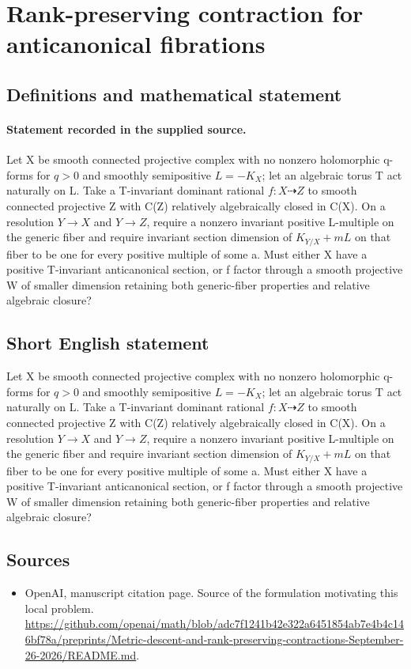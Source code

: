 \documentclass[11pt]{article}
\begin{document}
\section*{Rank-preserving contraction for anticanonical fibrations}\label{statement}
\subsection{Definitions and mathematical statement}
\paragraph{Statement recorded in the supplied source.}
Let X be smooth connected projective complex with no nonzero holomorphic q-forms for $q>0$ and smoothly semipositive $L=-K_X$; let an algebraic torus T act naturally on L. Take a T-invariant dominant rational $f:X\dashrightarrow Z$ to smooth connected projective Z with C(Z) relatively algebraically closed in C(X). On a resolution $Y\to X$ and $Y\to Z$, require a nonzero invariant positive L-multiple on the generic fiber and require invariant section dimension of $K_{Y/X}+mL$ on that fiber to be one for every positive multiple of some a. Must either X have a positive T-invariant anticanonical section, or f factor through a smooth projective W of smaller dimension retaining both generic-fiber properties and relative algebraic closure?
\subsection{Short English statement}
Let X be smooth connected projective complex with no nonzero holomorphic q-forms for $q>0$ and smoothly semipositive $L=-K_X$; let an algebraic torus T act naturally on L. Take a T-invariant dominant rational $f:X\dashrightarrow Z$ to smooth connected projective Z with C(Z) relatively algebraically closed in C(X). On a resolution $Y\to X$ and $Y\to Z$, require a nonzero invariant positive L-multiple on the generic fiber and require invariant section dimension of $K_{Y/X}+mL$ on that fiber to be one for every positive multiple of some a. Must either X have a positive T-invariant anticanonical section, or f factor through a smooth projective W of smaller dimension retaining both generic-fiber properties and relative algebraic closure?
\subsection{Sources}
\begin{itemize}
\item[S1] OpenAI, manuscript citation page. Source of the formulation motivating this local problem.
\url{https://github.com/openai/math/blob/adc7f1241b42e322a6451854ab7e4b4c146bf78a/preprints/Metric-descent-and-rank-preserving-contractions-September-26-2026/README.md}.
\end{itemize}
\end{document}
